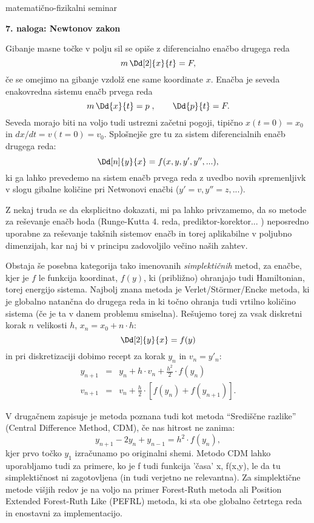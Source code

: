 \documentclass[12pt]{article}
\begin{document}
\thispagestyle{empty}


\setcounter{equation}{0}
\centerline{\sc matematično-fizikalni seminar \thisyear}
\bigskip
\setcounter{equation}{0}

\bigskip
\centerline{\bf 7. naloga: Newtonov zakon}
\bigskip
\bigskip

Gibanje masne točke v polju sil se opiše z diferencialno enačbo
drugega reda
\[
m\, \Dd[2]{x}{t} = F,
\]
če se omejimo na gibanje vzdolž ene same koordinate $x$. Enačba je
seveda enakovredna sistemu enačb prvega reda
\[
m\, \Dd{x}{t} = p \;, \qquad \Dd{p}{t} = F.
\]
Seveda morajo biti na voljo tudi ustrezni začetni pogoji, tipično
$x(t=0)=x_0$ in $dx/dt=v(t=0)=v_0$. Splošnejše gre tu za sistem diferencialnih
enačb drugega reda:
\[
\Dd[n]{y}{x} = f(x,y,y',y'',...),
\]
ki ga lahko prevedemo na sistem enačb prvega reda z uvedbo novih spremenljivk v slogu
gibalne količine pri Netwonovi enačbi ($y'=v,y''=z,...$).

Z nekaj truda se da eksplicitno dokazati, mi pa lahko privzamemo, da so metode za
reševanje enačb hoda (Runge-Kutta 4. reda, prediktor-korektor... ) neposredno uporabne
za reševanje takšnih sistemov enačb in torej aplikabilne v poljubno dimenzijah, kar
naj bi v principu zadovoljilo večino naših zahtev.

Obstaja še posebna kategorija tako imenovanih \emph{simplektičnih} metod, za enačbe, kjer je $f$ le funkcija koordinat, $f(y)$, ki (približno) ohranjajo tudi Hamiltonian,
torej energijo sistema. Najbolj znana metoda je Verlet/St\"ormer/Encke metoda, ki je globalno
natančna do drugega reda in ki točno ohranja tudi vrtilno količino sistema (če je ta v danem problemu smiselna). Rešujemo torej za vsak diskretni korak $n$ velikosti $h$, $x_n=x_0+n \cdot h$:
\[
\Dd[2]{y}{x} = f(y)
\]
in pri diskretizaciji dobimo recept za korak $y_n$ in $v_n=y'_n$:
\begin{eqnarray*}
y_{n+1} &=& y_n + h \cdot v_n + \frac{h^2}{2} \cdot f(y_n) \\
v_{n+1} &=& v_n +  \frac{h}{2} \cdot \left[ f(y_n) + f(y_{n+1}) \right].
\end{eqnarray*}

V drugačnem zapisuje je metoda poznana tudi kot metoda ``Središčne razlike'' (Central Difference Method, CDM), če nas hitrost ne zanima:
\[
y_{n+1} - 2 y_n + y_{n-1} = h^2 \cdot f(y_n),
\]
kjer prvo točko $y_1$ izračunamo po originalni shemi. Metodo CDM lahko uporabljamo tudi
za primere, ko je f tudi funkcija 'časa' x, f(x,y), le da tu simplektičnost ni zagotovljena
(in tudi verjetno ne relevantna).
Za simplektične metode višjih redov je na voljo na primer Forest-Ruth metoda ali Position
Extended Forest-Ruth Like (PEFRL) metoda, ki sta obe globalno četrtega reda in enostavni za
implementacijo.
\end{document}

